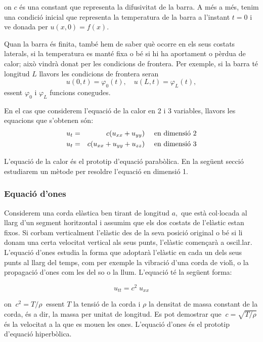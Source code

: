 \documentclass[12pt]{article}
\begin{document}
on $c$ {\'e}s una constant que representa la difusivitat de la barra. A m{\'e}s a m{\'e}s, tenim una
condici{\'o} inicial que representa la temperatura de la barra a l'instant $t=0$ i ve donada per $u(x,0)=f(x).$

Quan la barra {\'e}s finita, tamb{\'e} hem de saber qu{\`e} ocorre en els seus costats laterals, si la temperatura es mant{\'e} fixa o b{\'e} si hi ha aportament o p{\`e}rdua de calor; aix{\`o} vindr{\`a} donat per les condicions de frontera. Per exemple, si la barra t{\'e} longitud $L$ llavors les condicions de frontera seran
\[
 u(0,t)=\varphi_0(t), \quad u(L,t)=\varphi_L(t),
\]
essent $\varphi_0$ i $\varphi_L$ funcions conegudes.


En el cas que considerem  l'equaci{\'o} de la calor en  2 i 3 variables, llavors les equacions que s'obtenen s{\'o}n:
\vspace{0.4cm}\begin{eqnarray*}
u_t&=&c(u_{xx}+u_{yy})\quad\hbox{ en dimensi{\'o} 2}\\
u_t&=&c(u_{xx}+u_{yy}+u_{zz})\quad \hbox{ en dimensi{\'o} 3}
\end{eqnarray*}

L'equaci{\'o} de la calor {\'e}s el prototip d'equaci{\'o} parab{\`o}lica.
En la seg{\"u}ent secci{\'o} estudiarem un m{\`e}tode per resoldre l'equaci{\'o} en dimensi{\'o} 1.


\subsubsection{Equaci{\'o} d'ones}

Considerem una corda el{\`a}stica ben tirant de longitud $a,$ que
est{\`a} col$\cdot$locada al llarg d'un segment horitzontal i assumim
que els dos costats de l'el{\`a}stic estan fixos. Si corbam
verticalment l'el{\`a}stic des de la seva posici{\'o} original o b{\'e} si
li donam una certa velocitat vertical als seus punts, l'el{\`a}stic
comen\c{c}ar{\`a} a oscil.lar. L'equaci{\'o} d'ones estudia la
forma que adoptar{\`a} l'el{\`a}stic en cada un dels seus punts al llarg
del temps, com per exemple la vibraci{\'o} d'una corda de viol{\'\i},
o la propagaci{\'o} d'ones com les del so o la llum. L'equaci{\'o} t{\'e}
la seg{\"u}ent forma:

\[
 u_{tt}=c^2\; u_{xx}
\]

on $\ c^2=T/\rho\ $ essent $T$ la tensi{\'o} de la corda i $\rho$ la densitat de massa constant de la corda, {\'e}s a dir,
la massa per unitat de longitud. Es pot demostrar que $\ c=\sqrt{T/\rho}\ $ {\'e}s la velocitat a la que es mouen les ones.
L'equaci{\'o} d'ones {\'e}s el prototip d'equaci{\'o} hiperb{\`o}lica.
\end{document}
